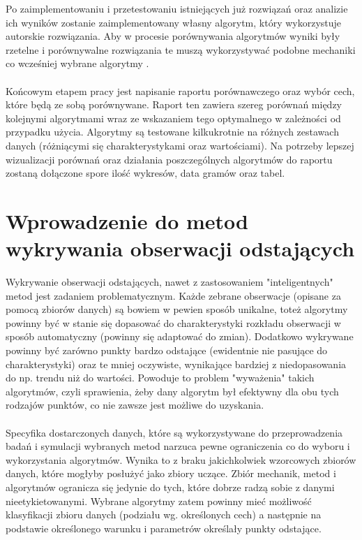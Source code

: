 \documentclass[eng,printmode]{mgr}
\begin{document}
Po zaimplementowaniu i przetestowaniu istniejących już rozwiązań oraz analizie ich wyników zostanie zaimplementowany własny algorytm, który wykorzystuje autorskie rozwiązania. Aby w procesie porównywania algorytmów wyniki były rzetelne i porównywalne rozwiązania te muszą wykorzystywać podobne mechaniki co wcześniej wybrane algorytmy \cite{isolation-forest}\cite{novelty}. 
\\\\
Końcowym etapem pracy jest napisanie raportu porównawczego oraz wybór cech, które będą ze sobą porównywane. Raport ten zawiera szereg porównań między kolejnymi algorytmami wraz ze wskazaniem tego optymalnego w zależności od przypadku użycia. Algorytmy są testowane kilkukrotnie na różnych zestawach danych (różniącymi się charakterystykami oraz wartościami). Na potrzeby lepszej wizualizacji porównań oraz działania poszczególnych algorytmów do raportu zostaną dołączone spore ilość wykresów, data gramów oraz tabel.

\chapter{Wprowadzenie do metod wykrywania obserwacji odstających}
Wykrywanie obserwacji odstających, nawet z zastosowaniem "inteligentnych" metod jest zadaniem problematycznym. Każde zebrane obserwacje (opisane za pomocą zbiorów danych) są bowiem w pewien sposób unikalne, toteż algorytmy powinny być w stanie się dopasować do charakterystyki rozkładu obserwacji w sposób automatyczny (powinny się adaptować do zmian). Dodatkowo wykrywane powinny być zarówno punkty bardzo odstające (ewidentnie nie pasujące do charakterystyki) oraz te mniej oczywiste, wynikające bardziej z niedopasowania do np. trendu niż do wartości. Powoduje to problem "wyważenia" takich algorytmów, czyli sprawienia, żeby dany algorytm był efektywny dla obu tych rodzajów punktów, co nie zawsze jest możliwe do uzyskania.
\\\\
Specyfika dostarczonych danych, które są wykorzystywane do przeprowadzenia badań i symulacji wybranych metod narzuca pewne ograniczenia co do wyboru i wykorzystania algorytmów. Wynika to z braku jakichkolwiek wzorcowych zbiorów danych, które mogłyby posłużyć jako zbiory uczące. Zbiór mechanik, metod i algorytmów ogranicza się jedynie do tych, które dobrze radzą sobie z danymi nieetykietowanymi. Wybrane algorytmy zatem powinny mieć możliwość klasyfikacji zbioru danych (podziału wg. określonych cech) a następnie na podstawie określonego warunku i parametrów określały punkty odstające.
\end{document}
